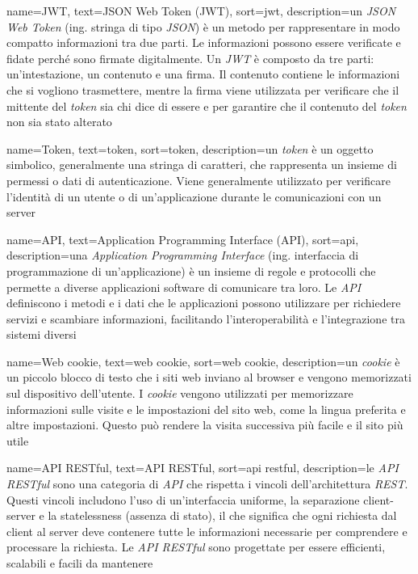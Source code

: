  {
    name=JWT,
    text=JSON Web Token (JWT),
    sort=jwt,
    description={un \emph{JSON Web Token} (ing. stringa di tipo \emph{JSON}) è un metodo per rappresentare in modo compatto informazioni tra due parti. Le informazioni possono essere verificate e fidate perché sono firmate digitalmente. Un \emph{JWT} è composto da tre parti: un'intestazione, un contenuto e una firma. Il contenuto contiene le informazioni che si vogliono trasmettere, mentre la firma viene utilizzata per verificare che il mittente del \emph{token} sia chi dice di essere e per garantire che il contenuto del \emph{token} non sia stato alterato}
}

 {
    name=Token,
    text=token,
    sort=token,
    description={un \emph{token} è un oggetto simbolico, generalmente una stringa di caratteri, che rappresenta un insieme di permessi o dati di autenticazione. Viene generalmente utilizzato per verificare l'identità di un utente o di un'applicazione durante le comunicazioni con un server}
}

 {
    name=API,
    text=Application Programming Interface (API),
    sort=api,
    description={una \emph{Application Programming Interface} (ing. interfaccia di programmazione di un'applicazione) è un insieme di regole e protocolli che permette a diverse applicazioni software di comunicare tra loro. Le \emph{API} definiscono i metodi e i dati che le applicazioni possono utilizzare per richiedere servizi e scambiare informazioni, facilitando l'interoperabilità e l'integrazione tra sistemi diversi}
}

 {
    name=Web cookie,
    text=web cookie,
    sort=web cookie,
    description={un \emph{cookie} è un piccolo blocco di testo che i siti web inviano al browser e vengono memorizzati sul dispositivo dell'utente. I \emph{cookie} vengono utilizzati per memorizzare informazioni sulle visite e le impostazioni del sito web, come la lingua preferita e altre impostazioni. Questo può rendere la visita successiva più facile e il sito più utile}
}

 {
    name=API RESTful,
    text=API RESTful,
    sort=api restful,
    description={le \emph{API RESTful} sono una categoria di \emph{API} che rispetta i vincoli dell'architettura \emph{REST}. Questi vincoli includono l'uso di un'interfaccia uniforme, la separazione client-server e la statelessness (assenza di stato), il che significa che ogni richiesta dal client al server deve contenere tutte le informazioni necessarie per comprendere e processare la richiesta. Le \emph{API RESTful} sono progettate per essere efficienti, scalabili e facili da mantenere}
}


